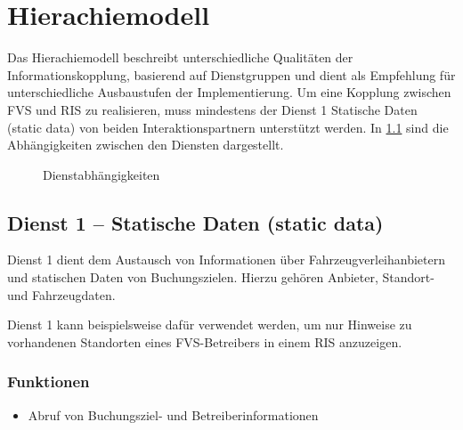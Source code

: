 \chapter{Hierachiemodell}
\label{cha:Hierachiemodell}
Das Hierachiemodell beschreibt unterschiedliche Qualitäten der Informationskopplung, basierend auf Dienstgruppen und dient als Empfehlung für unterschiedliche Ausbaustufen der Implementierung.
Um eine Kopplung zwischen FVS und RIS zu realisieren, muss mindestens der Dienst 1 Statische Daten (static data) von beiden Interaktionspartnern unterstützt werden. In \cref{fig:depend} sind die Abhängigkeiten zwischen den Diensten dargestellt.

\begin{figure}[h]
  \centering
  \caption{Dienstabhängigkeiten \label{fig:depend}}
\end{figure}

\section{Dienst 1 -- Statische Daten (static data)}
Dienst 1 dient dem Austausch von Informationen über Fahrzeugverleihanbietern und statischen Daten von Buchungszielen. Hierzu gehören Anbieter, Standort- und Fahrzeugdaten. 

Dienst 1 kann beispielsweise dafür verwendet werden, um nur Hinweise zu vorhandenen Standorten eines FVS-Betreibers in einem RIS anzuzeigen.
\subsection*{Funktionen}
\begin{itemize}
\item Abruf von Buchungsziel- und Betreiberinformationen
\end{itemize}

